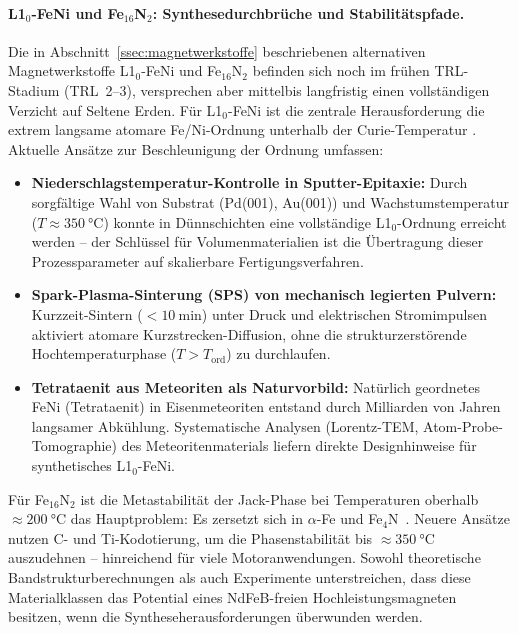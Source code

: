 ﻿\documentclass[12pt, a4paper]{report}
\theoremstyle{definition}
\theoremstyle{remark}
\begin{document}
\paragraph{L1${}_0$-FeNi und Fe${}_{16}$N${}_2$: Synthesedurchbrüche und
Stabilitätspfade.}
Die in Abschnitt~\ref{ssec:magnetwerkstoffe} beschriebenen alternativen
Magnetwerkstoffe L1$_0$-FeNi und Fe$_{16}$N$_2$ befinden sich noch im frühen
TRL-Stadium (TRL~2--3), versprechen aber mittelbis langfristig einen vollständigen
Verzicht auf Seltene Erden. Für L1$_0$-FeNi ist die zentrale Herausforderung die
extrem langsame atomare Fe/Ni-Ordnung unterhalb der Curie-Temperatur
\cite{coey2010}. Aktuelle Ansätze zur Beschleunigung der Ordnung umfassen:
\begin{itemize}
  \item \textbf{Niederschlagstemperatur-Kontrolle in Sputter-Epitaxie:}
        Durch sorgfältige Wahl von Substrat (Pd(001), Au(001)) und
        Wachstumstemperatur ($T \approx \SI{350}{\celsius}$) konnte in
        Dünnschichten eine vollständige L1$_0$-Ordnung erreicht werden --
        der Schlüssel für Volumenmaterialien ist die Übertragung dieser
        Prozessparameter auf skalierbare Fertigungsverfahren.
  \item \textbf{Spark-Plasma-Sinterung (SPS) von mechanisch legierten Pulvern:}
        Kurzzeit-Sintern ($<\SI{10}{\minute}$) unter Druck und elektrischen
        Stromimpulsen aktiviert atomare Kurzstrecken-Diffusion, ohne die
        strukturzerstörende Hochtemperaturphase ($T > T_{\text{ord}}$) zu
        durchlaufen.
  \item \textbf{Tetrataenit aus Meteoriten als Naturvorbild:}
        Natürlich geordnetes FeNi (Tetrataenit) in Eisenmeteoriten entstand
        durch Milliarden von Jahren langsamer Abkühlung. Systematische Analysen
        (Lorentz-TEM, Atom-Probe-Tomographie) des Meteoritenmaterials liefern
        direkte Designhinweise für synthetisches L1$_0$-FeNi.
\end{itemize}
Für Fe$_{16}$N$_2$ ist die Metastabilität der Jack-Phase bei Temperaturen
oberhalb $\approx \SI{200}{\celsius}$ das Hauptproblem: Es zersetzt sich in
$\alpha$-Fe und Fe$_4$N~\cite{sugita1994}. Neuere Ansätze nutzen C- und Ti-Kodotierung,
um die Phasenstabilität bis $\approx \SI{350}{\celsius}$ auszudehnen --
hinreichend für viele Motoranwendungen. Sowohl theoretische Bandstruktur\-berechnungen
\cite{herbst1991} als auch Experimente \cite{lewis2013, nakamura2018} unterstreichen,
dass diese Materialklassen das Potential eines NdFeB-freien Hochleistungsmagneten
besitzen, wenn die Syntheseherausforderungen überwunden werden.
\end{document}
